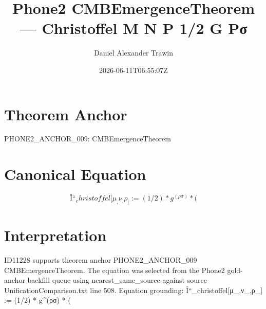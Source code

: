 \documentclass[11pt]{article}
\title{Phone2 CMBEmergenceTheorem — Christoffel Μ Ν Ρ 1/2 G Ρσ}
\author{Daniel Alexander Trawin}
\date{2026-06-11T06:55:07Z}
\begin{document}
\maketitle
\section*{Theorem Anchor}
PHONE2_ANCHOR_009: CMBEmergenceTheorem
\section*{Canonical Equation}
\[
Î“_christoffel[μ_,ν_,ρ_] := (1/2) * g^(ρσ) * (
\]
\section*{Interpretation}
ID11228 supports theorem anchor PHONE2_ANCHOR_009 CMBEmergenceTheorem. The equation was selected from the Phone2 gold-anchor backfill queue using nearest_same_source against source UnificationComparison.txt line 508. Equation grounding: Î“_christoffel[μ_,ν_,ρ_] := (1/2) * g^(ρσ) * (
\end{document}

